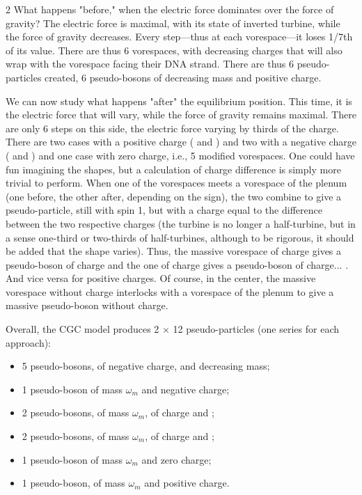 	\begin{multicols}{2}
	What happens "before," when the electric force dominates over the force of gravity? The electric force is maximal, with its state of inverted turbine, while the force of gravity decreases. Every step—thus at each vorespace—it loses 1/7th of its value. There are thus 6 vorespaces, with decreasing charges that will also wrap with the vorespace facing their DNA strand. There are thus 6 pseudo-particles created, 6 pseudo-bosons of decreasing mass and positive charge.
	
	We can now study what happens "after" the equilibrium position. This time, it is the electric force that will vary, while the force of gravity remains maximal. There are only 6 steps on this side, the electric force varying by thirds of the charge. There are two cases with a positive charge ( and ) and two with a negative charge ( and ) and one case with zero charge, i.e., 5 modified vorespaces. One could have fun imagining the shapes, but a calculation of charge difference is simply more trivial to perform. When one of the vorespaces meets a vorespace of the plenum (one before, the other after, depending on the sign), the two combine to give a pseudo-particle, still with spin 1, but with a charge equal to the difference between the two respective charges (the turbine is no longer a half-turbine, but in a sense one-third or two-thirds of half-turbines, although to be rigorous, it should be added that the shape varies). Thus, the massive vorespace of charge  gives a pseudo-boson of charge  and the one of charge  gives a pseudo-boson of charge... . And vice versa for positive charges. Of course, in the center, the massive vorespace without charge interlocks with a vorespace of the plenum to give a massive pseudo-boson without charge.
	\medskip 
	
	Overall, the CGC model produces 2 $\times$ 12 pseudo-particles (one series for each approach):
	
	\begin{itemize}
		\item 5 pseudo-bosons, of negative charge, and decreasing mass;
		\item 1 pseudo-boson of mass $\omega_m$ and negative charge;
		\item 2 pseudo-bosons, of mass $\omega_m$, of charge  and ;
		\item 2 pseudo-bosons, of mass $\omega_m$, of charge  and ;
		\item 1 pseudo-boson of mass $\omega_m$ and zero charge;
		\item 1 pseudo-boson, of mass $\omega_m$ and positive charge.
	\end{itemize}
	

\end{multicols}
